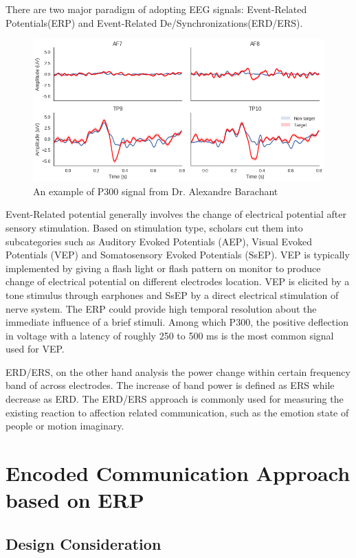 \documentclass[a4paper]{article}
\begin{document}
There are two major paradigm of adopting EEG signals: Event-Related Potentials(ERP) and Event-Related De/Synchronizations(ERD/ERS).\autocite{alarcao2017emotions}

\begin{figure}
	\centering
	\includegraphics[width= 0.8\linewidth]{P300}
	\caption{An example of P300 signal from Dr. Alexandre Barachant}
	\label{fig:P300}
\end{figure}

Event-Related potential generally involves the change of electrical potential after sensory stimulation. Based on stimulation type, scholars cut them into subcategories such as Auditory Evoked Potentials (AEP), Visual Evoked Potentials (VEP) and Somatosensory Evoked Potentials (SsEP)\autocite{alarcao2017emotions}. VEP is typically implemented by giving a flash light or flash pattern on monitor to produce change of electrical potential on different electrodes location. VEP is elicited by a tone stimulus through earphones and SsEP by a direct electrical stimulation of nerve system. The ERP could provide high temporal resolution about the immediate influence of a brief stimuli. Among which P300, the positive deflection in voltage with a latency of roughly 250 to 500 ms is the most common signal used for VEP. 

ERD/ERS, on the other hand analysis the power change within certain frequency band of across electrodes. The increase of band power is defined as ERS while decrease as ERD. The ERD/ERS approach is commonly used for measuring the existing reaction to affection related communication, such as the emotion state of people or motion imaginary.

\section{Encoded Communication Approach based on ERP}

\subsection{Design Consideration}
\end{document}
